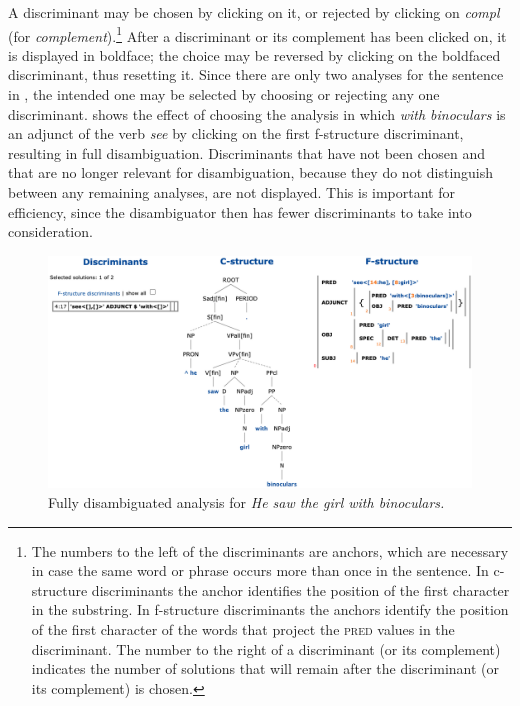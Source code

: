 \documentclass[output=paper,hidelinks]{langscibook}
\begin{document}
A discriminant may be chosen by clicking on it, or rejected by clicking on \textit{compl} (for \textit{complement}).\footnote{The numbers to the left of the discriminants are anchors, which are necessary in case the same word or phrase occurs more than once in the sentence.
In c-structure discriminants the anchor identifies the position of the first character in the substring.
In f-structure discriminants the anchors identify the position of the first character of the words that project the \textsc{pred} values in the discriminant.
The number to the right of a discriminant (or its complement) indicates the number of solutions that will remain after the discriminant (or its complement) is chosen.}
After a discriminant or its complement has been clicked on, it is displayed in boldface; the choice may be reversed by clicking on the boldfaced discriminant, thus resetting it.
Since there are only two analyses for the sentence in , the intended one may be selected by choosing or rejecting any one discriminant.
 shows the effect of choosing the analysis in which \textit{with binoculars} is an adjunct of the verb \textit{see} by clicking on the first f-structure discriminant, resulting in full disambiguation.
Discriminants that have not been chosen and that are no longer relevant for disambiguation, because they do not distinguish between any remaining analyses, are not displayed.
This is important for efficiency, since the disambiguator then has fewer discriminants to take into consideration.

\begin{figure}
    \includegraphics[width=\textwidth]{figures/Treebanks/binoculars-disamb.png}
    \caption{Fully disambiguated analysis for \textit{He saw the girl with binoculars.}}
    \label{fig:binoculars-disambiguated}
\end{figure}
\end{document}
